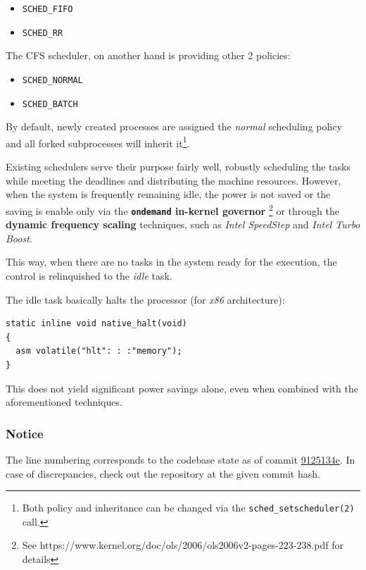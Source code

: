 \documentclass[]{report}
\begin{document}
\begin{itemize}
\itemsep1pt\parskip0pt
\item
  \lstinline!SCHED_FIFO!
\item
  \lstinline!SCHED_RR!
\end{itemize}

The CFS scheduler, on another hand is providing other 2 policies:

\begin{itemize}
\itemsep1pt\parskip0pt
\item
  \lstinline!SCHED_NORMAL!
\item
  \lstinline!SCHED_BATCH!
\end{itemize}

By default, newly created processes are assigned the \emph{normal}
scheduling policy and all forked subprocesses will inherit it\footnote{Both
  policy and inheritance can be changed via the
  \lstinline!sched_setscheduler(2)! call.}.

Existing schedulers serve their purpose fairly well, robustly scheduling
the tasks while meeting the deadlines and distributing the machine
resources. However, when the system is frequently remaining idle, the
power is not saved or the saving is enable only via the
\textbf{\lstinline!ondemand! in-kernel governor} \footnote{See
  https://www.kernel.org/doc/ols/2006/ols2006v2-pages-223-238.pdf for
  details} or through the \textbf{dynamic frequency scaling} techniques,
such as \emph{Intel SpeedStep} and \emph{Intel Turbo Boost}.

This way, when there are no tasks in the system ready for the execution,
the control is relinquished to the \emph{idle} task.

The idle task basically halts the processor (for \emph{x86}
architecture):

\begin{lstlisting}[style=c, caption=arch/x86/include/asm/irqflags.h, firstnumber=52]
static inline void native_halt(void)
{
  asm volatile("hlt": : :"memory");
}
\end{lstlisting}

This does not yield significant power savings alone, even when combined
with the aforementioned techniques.

\subsubsection{Notice}\label{notice}

The line numbering corresponds to the codebase state as of commit
\href{https://gitlab.tubit.tu-berlin.de/mirko/operating-system-\%20project/tree/9125134e9dcbcdd7a6ce3300712834c6369cfc3b}{9125134e}.
In case of discrepancies, check out the repository at the given commit
hash.
\end{document}
